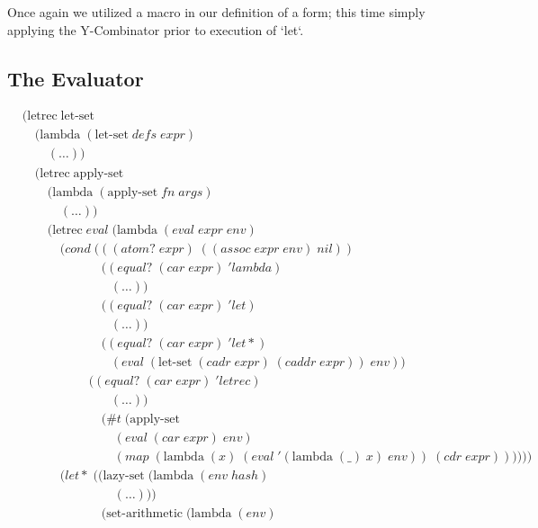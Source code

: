 Once again we utilized a macro in our definition of a form; this time simply
applying the Y-Combinator prior to execution of `let`.

\subsection{The Evaluator}
\begin{align*}
& (\text{letrec} \; \text{let-set} \; 
\\& \quad (\text{lambda} \; (\text{let-set} \; defs \; expr)
\\& \qquad (\dots))
\\& \quad (\text{letrec} \; \text{apply-set} \; 
\\& \qquad (\text{lambda} \; (\text{apply-set} \; fn \; args)
\\& \qquad \quad (\dots))
\\& \qquad (\text{letrec} \; eval \; (\text{lambda} \; (eval \; expr \; env)
\\& \qquad \quad (cond \; (((atom? \; expr) \; ((assoc \; expr \; env) \; nil))
\\& \qquad \qquad \qquad \; ((equal? \; (car \; expr) \; 'lambda) \; 
\\& \qquad \qquad \qquad \quad (\dots))
\\& \qquad \qquad \qquad \; ((equal? \; (car \; expr) \; 'let)
\\& \qquad \qquad \qquad \quad (\dots))
\\& \qquad \qquad \qquad \; ((equal? \; (car \; expr) \; 'let*) \; 
\\& \qquad \qquad \qquad \quad (eval \; (\text{let-set} \; (cadr \; expr) \; (caddr \; expr)) \; env))
\\& \qquad \qquad \quad \; ((equal? \; (car \; expr) \; 'letrec)
\\& \qquad \qquad \qquad \quad (\dots))
\\& \qquad \qquad \qquad \; (\#t \; (\text{apply-set} \; 
\\& \qquad \qquad \qquad \quad \; (eval \; (car \; expr) \; env) \; 
\\& \qquad \qquad \qquad \quad \; (map \; (\text{lambda} \; (x) \; (eval \; '(\text{lambda} \; (\_) \; x) \; env)) \; (cdr \; expr))))))
\\& \qquad \quad (let* \; ((\text{lazy-set} \; (\text{lambda} \; (env \; hash)
\\& \qquad \qquad \qquad \quad \; (\dots)))
\\& \qquad \qquad \qquad \; (\text{set-arithmetic} \; (\text{lambda} \; (env)

\end{align*}
